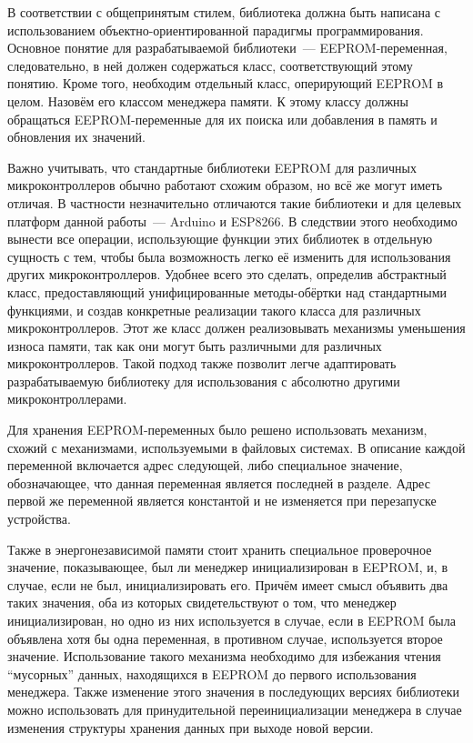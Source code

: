 В соответствии с общепринятым стилем, библиотека должна быть написана с использованием объектно-ориентированной парадигмы программирования.
Основное понятие для разрабатываемой библиотеки~--- EEPROM-переменная, следовательно, в ней должен содержаться класс, соответствующий этому понятию.
Кроме того, необходим отдельный класс, оперирующий EEPROM в целом. Назовём его классом менеджера памяти.
К этому классу должны обращаться EEPROM-переменные для их поиска или добавления в память и обновления их значений.

Важно учитывать, что стандартные библиотеки EEPROM для различных микроконтроллеров обычно работают схожим образом, но всё же могут иметь отличая.
В частности незначительно отличаются такие библиотеки и для целевых платформ данной работы~--- Arduino и ESP8266.
В следствии этого необходимо вынести все операции, использующие функции этих библиотек в отдельную сущность с тем, чтобы была возможность легко её изменить для использования других микроконтроллеров.
Удобнее всего это сделать, определив абстрактный класс, предоставляющий унифицированные методы-обёртки над стандартными функциями, и создав конкретные реализации такого класса для различных микроконтроллеров.
Этот же класс должен реализовывать механизмы уменьшения износа памяти, так как они могут быть различными для различных микроконтроллеров.
Такой подход также позволит легче адаптировать разрабатываемую библиотеку для использования с абсолютно другими микроконтроллерами.

Для хранения EEPROM-переменных было решено использовать механизм, схожий с механизмами, используемыми в файловых системах.
В описание каждой переменной включается адрес следующей, либо специальное значение, обозначающее, что данная переменная является последней в разделе.
Адрес первой же переменной является константой и не изменяется при перезапуске устройства.

Также в энергонезависимой памяти стоит хранить специальное проверочное значение, показывающее, был ли менеджер инициализирован в EEPROM, и, в случае, если не был, инициализировать его.
Причём имеет смысл объявить два таких значения, оба из которых свидетельствуют о том, что менеджер инициализирован, но одно из них используется в случае, если в EEPROM была объявлена хотя бы одна переменная, в противном случае, используется второе значение.
Использование такого механизма необходимо для избежания чтения "`мусорных"' данных, находящихся в EEPROM до первого использования менеджера.
Также изменение этого значения в последующих версиях библиотеки можно использовать для принудительной переинициализации менеджера в случае изменения структуры хранения данных при выходе новой версии.

